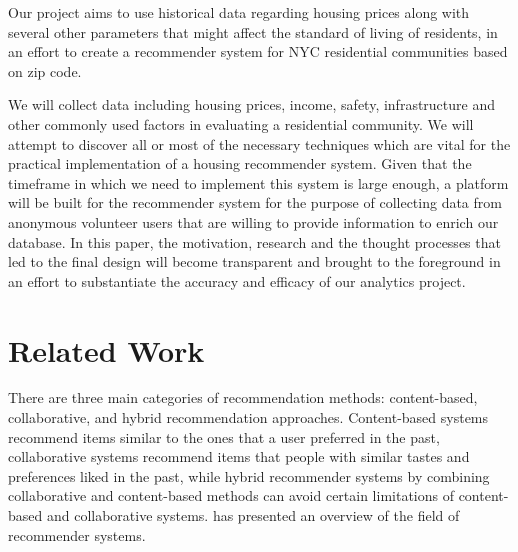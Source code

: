 \documentclass[letterpaper,twocolumn,10pt]{article}
\begin{document}
Our project aims to use historical data regarding housing prices along with several other parameters that might affect the standard of living of residents, in an effort to create a recommender system for NYC residential communities based on zip code. 

We will collect data including housing prices, income, safety, infrastructure and other commonly used factors in evaluating a residential community. We will attempt to discover all or most of the necessary techniques which are vital for the practical implementation of a housing recommender system. Given that  the timeframe in which we need to implement this system is large enough, a platform will be built for the recommender system for the purpose of collecting data from anonymous volunteer users that are willing to provide information to enrich our database.
In this paper, the motivation, research and the thought processes that led to the final design will become transparent and brought to the foreground in an effort to substantiate the accuracy and efficacy of our analytics project.


%

\section{Related Work}
There are three main categories of recommendation methods:  content-based, collaborative, and hybrid recommendation approaches. 
 Content-based systems recommend items similar to the ones that a user preferred in the past,  collaborative systems recommend items  that people with similar tastes and preferences liked in the past, while  hybrid recommender systems by combining collaborative and content-based methods  can avoid certain limitations of content-based and collaborative systems. \cite{AT05} has presented an overview of the field of recommender systems.
 
\end{document}
